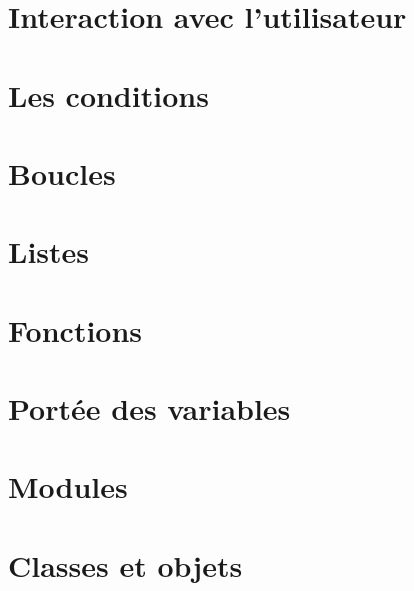 \documentclass[12pt,a4paper,oneside]{report}
\begin{document}
\section{Interaction avec l'utilisateur}


\section{Les conditions}


\section{Boucles}


\section{Listes}


\section{Fonctions}


\section{Portée des variables}


\section{Modules}





\section{Classes et objets}


\end{document}
